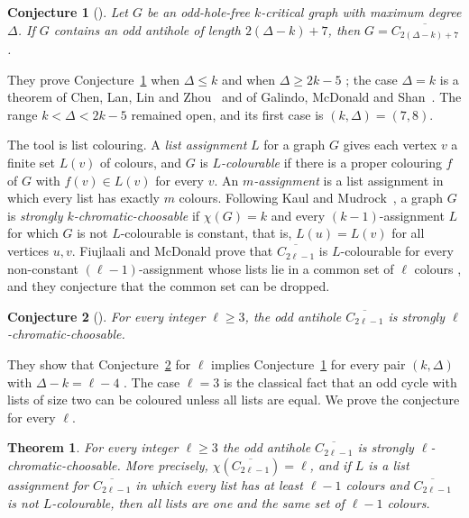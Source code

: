 \documentclass[11pt,a4paper,reqno]{amsart}
\newtheorem{theorem}{Theorem}[section]
\newtheorem{conjecture}{Conjecture}
\theoremstyle{definition}
\theoremstyle{remark}
\newcommand{\cbar}[1]{\overline{C_{#1}}}
\begin{document}
\begin{conjecture}[{\cite[Conjecture~3]{FM}}]\label{conj:3}
Let $G$ be an odd-hole-free $k$-critical graph with maximum degree $\Delta$. If $G$ contains an odd antihole of length $2(\Delta-k)+7$, then $G=\cbar{2(\Delta-k)+7}$.
\end{conjecture}

They prove Conjecture~\ref{conj:3} when $\Delta\le k$ and when $\Delta\ge2k-5$ \cite[Theorem~4]{FM}; the case $\Delta=k$ is a theorem of Chen, Lan, Lin and Zhou~\cite{CLLZ} and of Galindo, McDonald and Shan~\cite{GMS}. The range $k<\Delta<2k-5$ remained open, and its first case is $(k,\Delta)=(7,8)$.

The tool is list colouring. A \emph{list assignment} $L$ for a graph $G$ gives each vertex $v$ a finite set $L(v)$ of colours, and $G$ is \emph{$L$-colourable} if there is a proper colouring $f$ of $G$ with $f(v)\in L(v)$ for every $v$. An \emph{$m$-assignment} is a list assignment in which every list has exactly $m$ colours. Following Kaul and Mudrock~\cite{KM}, a graph $G$ is \emph{strongly $k$-chromatic-choosable} if $\chi(G)=k$ and every $(k-1)$-assignment $L$ for which $G$ is not $L$-colourable is constant, that is, $L(u)=L(v)$ for all vertices $u,v$. Fiujlaali and McDonald prove that $\cbar{2\ell-1}$ is $L$-colourable for every non-constant $(\ell-1)$-assignment whose lists lie in a common set of $\ell$ colours \cite[Theorem~8]{FM}, and they conjecture that the common set can be dropped.

\begin{conjecture}[{\cite[Conjecture~9]{FM}}]\label{conj:9}
For every integer $\ell\ge3$, the odd antihole $\cbar{2\ell-1}$ is strongly $\ell$-chromatic-choosable.
\end{conjecture}

They show that Conjecture~\ref{conj:9} for $\ell$ implies Conjecture~\ref{conj:3} for every pair $(k,\Delta)$ with $\Delta-k=\ell-4$ \cite[Theorem~10]{FM}. The case $\ell=3$ is the classical fact that an odd cycle with lists of size two can be coloured unless all lists are equal. We prove the conjecture for every $\ell$.

\begin{theorem}\label{thm:main}
For every integer $\ell\ge3$ the odd antihole $\cbar{2\ell-1}$ is strongly $\ell$-chromatic-choosable. More precisely, $\chi(\cbar{2\ell-1})=\ell$, and if $L$ is a list assignment for $\cbar{2\ell-1}$ in which every list has at least $\ell-1$ colours and $\cbar{2\ell-1}$ is not $L$-colourable, then all lists are one and the same set of $\ell-1$ colours.
\end{theorem}
\end{document}
